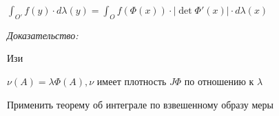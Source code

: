 \documentclass[paper=a4, fontsize=17pt]{article}
\begin{document}
$\int_{O'}f(y) \cdot d \lambda(y) = \int_O f(\Phi(x)) \cdot |\det \Phi'(x)| \cdot d \lambda(x)$

\emph{Доказательство:}

Изи

$\nu(A) = \lambda \Phi (A), \nu$ имеет плотность $J \Phi$ по отношению к $\lambda$

Применить теорему об интеграле по взвешенному образу меры 


\end{document}
